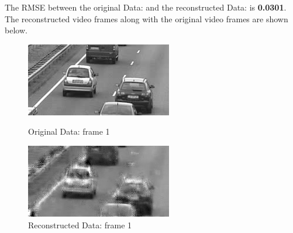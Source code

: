 \documentclass[12pt]{article}
\begin{document}
\begin{itemize}
\begin{enumerate}
    The RMSE between the original Data: and the reconstructed Data: is \textbf{0.0301}. \\

    The reconstructed video frames along with the original video frames are shown below.

    \begin{figure}[H]
        \centering
        \begin{minipage}{.45\textwidth}
            \centering
            \includegraphics[width=\linewidth]{results/cars_7_orig_1.png}
            \caption*{Original Data: frame 1}
        \end{minipage}
        \begin{minipage}{.45\textwidth}
            \centering
            \includegraphics[width=\linewidth]{results/cars_7_recon_1.png}
            \caption*{Reconstructed Data: frame 1}
        \end{minipage}
    \end{figure}


\end{enumerate}
\end{itemize}
\end{document}
